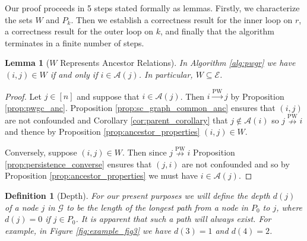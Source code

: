 \documentclass{statsoc}
\def\pwgc{\overset{\text{PW}}{\rightarrow}}  %
\def\npwgc{\overset{\text{PW}}{\nrightarrow}}  %
\def\gcg{\mathcal{G}}  %
\def\gcge{\mathcal{E}}  %
\newcommand{\anc}[1]{\mathcal{A}(#1)}  %
\newtheorem{lemma}{Lemma}
\newtheorem{definition}{Definition}
\begin{document}
Our proof proceeds in 5 steps stated formally as lemmas.  Firstly, we
characterize the sets $W$ and $P_k$.  Then we establish a correctness
result for the inner loop on $r$, a correctness result for the outer
loop on $k$, and finally that the algorithm terminates in a finite
number of steps.

\begin{lemma}[$W$ Represents Ancestor Relations]
  \label{lem:W_subset_E}
  In Algorithm \ref{alg:pwgr} we have
  $(i, j) \in W$ if and only if $i \in \anc{j}$.  In particular,
  $W \subseteq \gcge$.
\end{lemma}
\begin{proof}
  Let $j \in [n]$ and suppose that $i \in \anc{j}$.  Then $i \pwgc j$
  by Proposition \ref{prop:pwgc_anc}.  Proposition
  \ref{prop:sc_graph_common_anc} ensures that $(i, j)$ are not
  confounded and Corollary \ref{cor:parent_corollary} that
  $j \not\in \anc{i}$ so $j \npwgc i$ and thence by Proposition
  \ref{prop:ancestor_properties} $(i, j) \in W$.

  Conversely, suppose $(i, j) \in W$.  Then since $j \npwgc i$
  Proposition \ref{prop:persistence_converse} ensures that $(j, i)$
  are not confounded and so by Proposition \ref{prop:ancestor_properties}
  we must have $i \in \anc{j}$.
\end{proof}

\begin{definition}[Depth]
  For our present purposes we will define the \textit{depth} $d(j)$ of
  a node $j$ in $\gcg$ to be the length of the \textit{longest} path
  from a node in $P_0$ to $j$, where $d(j) = 0$ if $j \in P_0$.  It is
  apparent that such a path will always exist.  For example, in Figure
  \ref{fig:example_fig3} we have $d(3) = 1$ and $d(4) = 2$.
\end{definition}
\end{document}
